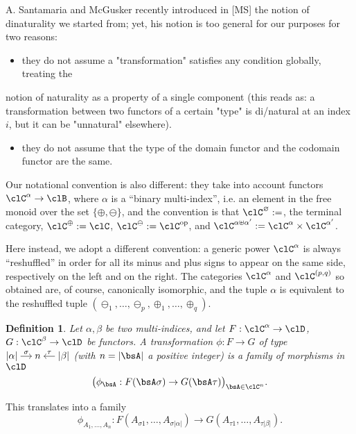 \documentclass[11pt]{amsart}
\renewcommand{\ell}[1]{\lvert #1 \rvert}
\newtheorem{definition}{Definition}
\def\op{\text{op}}
\begin{document}
A. Santamaria and McGusker recently introduced in [MS] the notion of dinaturality we started from; 
yet, his notion is too general for our purposes for two reasons:

\begin{itemize}
\item they do not assume a "transformation" satisfies any condition globally, treating the
\end{itemize}
notion of naturality as a property of a single component (this reads as: a transformation between two functors of a certain "type" is di/natural at an index \(i\), but it can be "unnatural" elsewhere). 
\begin{itemize}
\item they do not assume that the type of the domain functor and the codomain functor are the same.
\end{itemize}

Our notational convention is also different: they take into account functors \(\clC^\alpha \to \clB\), where \(\alpha\) is a ``binary multi-index'', i.e. an element in the free monoid over the set \(\{\oplus,\ominus\}\), and the convention is that \(\clC^\varnothing := \*\), the terminal category, \(\clC^\oplus := \clC\), \(\clC^\ominus := \clC^\op\), and \(\clC^{\alpha \uplus \alpha'} := \clC^\alpha \times \clC^{\alpha'}\).

Here instead, we adopt a different convention: a generic power \(\clC^\alpha\) is always ``reshuffled'' in order for all its minus and plus signs to appear on the same side, respectively on the left and on the right. The categories \(\clC^\alpha\) and \(\pq{\clC}\) so obtained are, of course, canonically isomorphic, and the tuple \(\alpha\) is equivalent to the reshuffled tuple \((\ominus_1,\dots,\ominus_p,\oplus_1,\dots,\oplus_q)\).

\begin{definition}\label{def:transformation}
	Let $\alpha,\beta$ be two multi-indices, and let $F : \clC^\alpha \to \clD$, $G : \clC^\beta \to \clD$ be functors. A \emph{transformation} $\phi : F \to G$ \emph{of type}
	$
		\begin{tikzcd}[cramped,sep=small]
			\ell\alpha \ar[r,"\sigma"] & n & \ell\beta \ar[l,"\tau"']
		\end{tikzcd}
	$
	(with $n = \ell \bsA$ a positive integer) is a family of morphisms in $\clD$
	\[
		\bigl( \phi_{\bsA} : F(\bsA\sigma) \to G(\bsA\tau) \bigr)_{\bsA \in \clC^n}.
	\]
\end{definition}
This translates into a family 
\[ 
	\phi_{A_1,\dots,A_n} : F(A_{\sigma 1}, \dots, A_{\sigma\ell\alpha}) \to G(A_{\tau1},\dots,A_{\tau\ell\beta}).
\]
\end{document}
